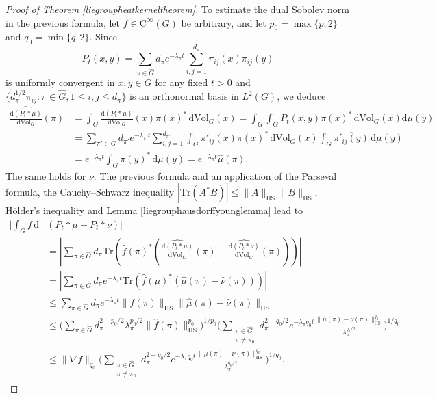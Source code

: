 \documentclass[11pt,a4paper]{article}
\theoremstyle{definition}
\begin{document}
\begin{proof}[Proof of Theorem \ref{liegroupheatkerneltheorem}]
To estimate the dual Sobolev norm in the previous formula, let $f \in \mathrm{C}^{\infty}(G)$ be arbitrary, and let $p_0=\max \{ p, 2 \}$ and $q_0=\min \{ q, 2 \}$. Since
\[ P_t(x,y) = \sum_{\pi \in \widehat{G}} d_{\pi} e^{-\lambda_{\pi}t} \sum_{i,j=1}^{d_{\pi}} \pi_{ij}(x) \overline{\pi_{ij}(y)} \]
is uniformly convergent in $x,y \in G$ for any fixed $t>0$ and $\{ d_{\pi}^{1/2} \pi_{ij} : \pi \in \widehat{G}, 1 \le i,j \le d_{\pi} \}$ is an orthonormal basis in $L^2(G)$, we deduce
\[ \begin{split} \widehat{\frac{\mathrm{d}(P_t * \mu)}{\mathrm{d}\mathrm{Vol}_G}}(\pi) &= \int_G \frac{\mathrm{d}(P_t * \mu)}{\mathrm{d}\mathrm{Vol}_G} (x) \pi (x)^* \, \mathrm{d}\mathrm{Vol}_G (x) = \int_G \int_G P_t (x,y) \pi (x)^* \, \mathrm{d}\mathrm{Vol}_G (x) \mathrm{d}\mu(y) \\ &=\sum_{\pi' \in \widehat{G}} d_{\pi'} e^{-\lambda_{\pi'}t} \sum_{i,j=1}^{d_{\pi'}} \int_G \pi'_{ij}(x) \pi(x)^* \, \mathrm{d}\mathrm{Vol}_G (x) \int_G \overline{\pi'_{ij}(y)} \, \mathrm{d}\mu(y) \\ &= e^{-\lambda_{\pi} t} \int_G \pi(y)^* \, \mathrm{d}\mu (y) = e^{-\lambda_{\pi}t} \widehat{\mu}(\pi) . \end{split} \]
The same holds for $\nu$. The previous formula and an application of the Parseval formula, the Cauchy--Schwarz inequality $|\mathrm{Tr}(A^*B)| \le \| A \|_{\mathrm{HS}} \| B \|_{\mathrm{HS}}$, H\"older's inequality and Lemma \ref{liegrouphausdorffyounglemma} lead to
\[ \begin{split} \Bigg| \int_G f \, \mathrm{d} &(P_t * \mu - P_t * \nu) \Bigg| \\ &= \left| \sum_{\pi \in \widehat{G}} d_{\pi} \mathrm{Tr} \left( \widehat{f}(\pi)^* \left( \widehat{\frac{\mathrm{d}(P_t * \mu)}{\mathrm{d}\mathrm{Vol}_G}}(\pi) - \widehat{\frac{\mathrm{d}(P_t * \nu)}{\mathrm{d}\mathrm{Vol}_G}}(\pi) \right) \right) \right| \\ &= \left| \sum_{\pi \in \widehat{G}} d_{\pi} e^{-\lambda_{\pi}t} \mathrm{Tr} \left( \widehat{f}(\mu)^* (\widehat{\mu}(\pi) - \widehat{\nu}(\pi)) \right) \right| \\ &\le \sum_{\pi \in \widehat{G}} d_{\pi} e^{-\lambda_{\pi}t} \| \widehat{f}(\pi) \|_{\mathrm{HS}} \| \widehat{\mu}(\pi) - \widehat{\nu}(\pi) \|_{\mathrm{HS}} \\ &\le \Bigg( \sum_{\pi \in \widehat{G}} d_{\pi}^{2-p_0/2} \lambda_{\pi}^{p_0/2} \| \widehat{f}(\pi) \|_{\mathrm{HS}}^{p_0} \Bigg)^{1/p_0} \Bigg( \sum_{\substack{\pi \in \widehat{G} \\ \pi \neq \pi_0}} d_{\pi}^{2-q_0/2} e^{-\lambda_{\pi} q_0 t} \frac{\| \widehat{\mu}(\pi) - \widehat{\nu}(\pi) \|_{\mathrm{HS}}^{q_0}}{\lambda_{\pi}^{q_0/2}} \Bigg)^{1/q_0} \\ &\le \| \nabla f \|_{q_0} \Bigg( \sum_{\substack{\pi \in \widehat{G} \\ \pi \neq \pi_0}} d_{\pi}^{2-q_0/2} e^{-\lambda_{\pi} q_0 t} \frac{\| \widehat{\mu}(\pi) - \widehat{\nu}(\pi) \|_{\mathrm{HS}}^{q_0}}{\lambda_{\pi}^{q_0/2}} \Bigg)^{1/q_0} . \end{split} \]

\end{proof}
\end{document}

